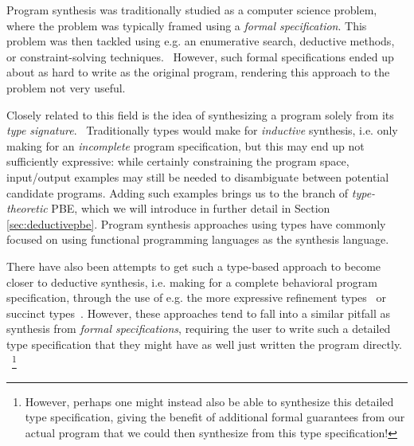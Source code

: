 \documentclass{article}
\begin{document}
Program synthesis was traditionally studied as a computer science problem,
where the problem was typically framed using a \emph{formal specification}.
This problem was then tackled using e.g. an enumerative search, deductive methods, or constraint-solving techniques.~\citep{gulwani2017program}
However, such formal specifications ended up about as hard to write as the original program,
rendering this approach to the problem not very useful.

Closely related to this field is the idea of synthesizing a program solely from its \emph{type signature}.~\citep{djinn,synquid}
Traditionally types would make for \emph{inductive} synthesis,
i.e. only making for an \emph{incomplete} program specification,
but this may end up not sufficiently expressive:
while certainly constraining the program space,
input/output examples may still be needed to disambiguate between potential candidate programs.
Adding such examples brings us to the branch of \emph{type-theoretic} PBE,
which we will introduce in further detail in Section \ref{sec:deductivepbe}.
Program synthesis approaches using types have commonly focused on using functional programming languages as the synthesis language.%
~\citep{synquid,eguchi2018automated,scythe,scout,gissurarson2018suggesting,idris,lenses}

There have also been attempts to get such a type-based approach to become closer to deductive synthesis,
i.e. making for a complete behavioral program specification,
through the use of e.g. the more expressive refinement types~\citep{synquid} or succinct types~\citep{guospeeding}.
However, these approaches tend to fall into a similar pitfall as synthesis from \emph{formal specifications},
requiring the user to write such a detailed type specification that they might have as well just written the program directly.%
~\footnote{
    However, perhaps one might instead also be able to synthesize this detailed type specification,
    giving the benefit of additional formal guarantees from our actual program that we could then synthesize from this type specification!
}

\end{document}
